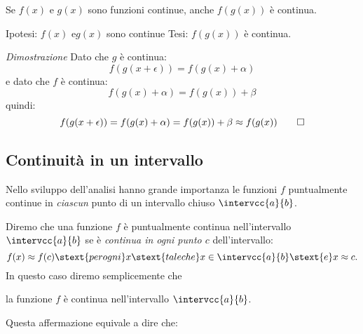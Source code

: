 \begin{teorema}
Se \(f(x)\) e \(g(x)\) sono funzioni continue, anche \(f(g(x))\) è continua.
\end{teorema}

\noindent Ipotesi: 
\(f(x) \text{ e} g(x)\) sono continue
\tab Tesi: 
\(f(g(x))\) è continua.

\emph{Dimostrazione}
Dato che \(g\) è continua: 
\[f(g(x+\epsilon)) = f(g(x)+\alpha)\]
e dato che \(f\) è continua: 
\[f(g(x)+\alpha)=f(g(x))+\beta\]
quindi: 
\[f(g(x+\epsilon)) = f(g(x)+\alpha) = f(g(x))+\beta \approx f(g(x)) \qed\]

\subsection{Continuità in un intervallo}
\label{subsec:cont_definizione}

Nello sviluppo dell'analisi hanno grande importanza le funzioni 
\(f\) puntualmente continue in \emph{ciascun} punto di un intervallo chiuso 
\(\intervcc{a}{b}\).

Diremo che una funzione \(f\) è puntualmente continua nell'intervallo 
\(\intervcc{a}{b}\) se è \emph{continua in ogni punto \(c\)} dell'intervallo:
\[f(x) \approx f(c) \stext{per ogni} x \stext{tale che} 
x \in \intervcc{a}{b} \stext{e} x \approx c.\] 
In questo caso diremo semplicemente che 
\begin{center}
la funzione \(f\) è continua nell'intervallo \(\intervcc{a}{b}\). 
\end{center}
Questa affermazione equivale a dire che:

 
